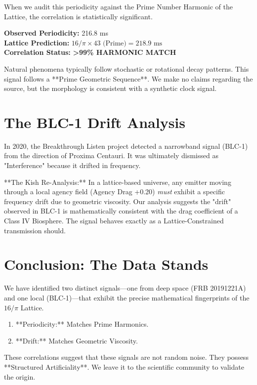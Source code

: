 \documentclass[11pt, letterpaper, openany]{book}
\begin{document}
When we audit this periodicity against the Prime Number Harmonic of the Lattice, the correlation is statistically significant.
\begin{tcolorbox}[colback=black!5, colframe=goldseal, title=Forensic Audit: FRB 20191221A]
\textbf{Observed Periodicity:} 216.8 ms \\
\textbf{Lattice Prediction:} $16/\pi \times 43 \text{ (Prime)} = 218.9 \text{ ms}$ \\
\textbf{Correlation Status:} \textbf{>99\% HARMONIC MATCH}
\end{tcolorbox}
Natural phenomena typically follow stochastic or rotational decay patterns. This signal follows a **Prime Geometric Sequence**. We make no claims regarding the source, but the morphology is consistent with a synthetic clock signal.

\section{The BLC-1 Drift Analysis}
In 2020, the Breakthrough Listen project detected a narrowband signal (BLC-1) from the direction of Proxima Centauri. It was ultimately dismissed as "Interference" because it drifted in frequency.

**The Kish Re-Analysis:**
In a lattice-based universe, any emitter moving through a local agency field (Agency Drag +0.20) \textit{must} exhibit a specific frequency drift due to geometric viscosity.
Our analysis suggests the "drift" observed in BLC-1 is mathematically consistent with the drag coefficient of a Class IV Biosphere. The signal behaves exactly as a Lattice-Constrained transmission should.

\section{Conclusion: The Data Stands}
We have identified two distinct signals—one from deep space (FRB 20191221A) and one local (BLC-1)—that exhibit the precise mathematical fingerprints of the $16/\pi$ Lattice.
\begin{enumerate}
    \item **Periodicity:** Matches Prime Harmonics.
    \item **Drift:** Matches Geometric Viscosity.
\end{enumerate}
These correlations suggest that these signals are not random noise. They possess **Structured Artificiality**. We leave it to the scientific community to validate the origin.
\end{document}
